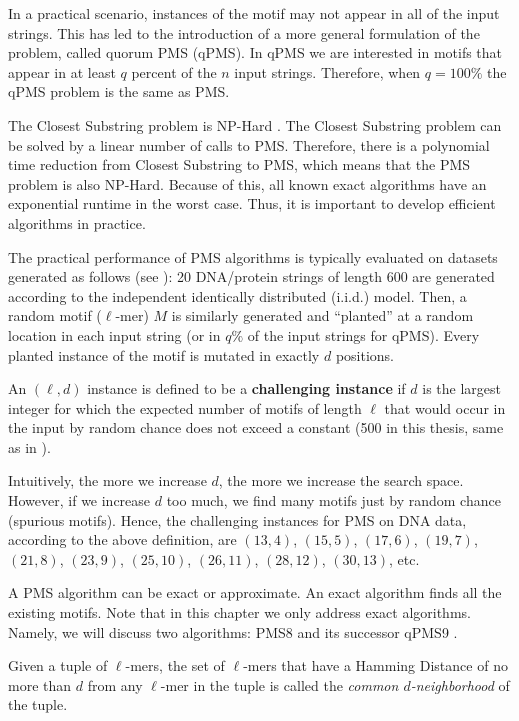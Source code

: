 In a practical scenario, instances of the motif may not appear in all of
the input strings. This has led to the introduction of a more general
formulation of the problem, called quorum PMS (qPMS). In qPMS we are interested
in motifs that appear in at least $q$ percent of the $n$ input strings.
Therefore, when $q=100\%$ the qPMS problem is the same as PMS.

The Closest Substring problem is NP-Hard \cite{LLM+99}. The Closest Substring
problem can be solved by a linear number of calls to PMS. Therefore,
there is a polynomial time reduction from Closest Substring to PMS, which
means that the PMS problem is also NP-Hard. Because of this, all known exact
algorithms have an exponential runtime in the worst case.
Thus, it is important to develop efficient algorithms in practice. 

The practical performance of PMS algorithms is
typically evaluated on datasets generated as follows (see \cite{Pev00,DBR07}):
20 DNA/protein strings of length 600 are generated according to the
independent identically distributed (i.i.d.) model. Then, a random
motif ($\ell$-mer) $M$ is similarly generated and ``planted'' at a random
location in each input string (or in $q\%$ of the input strings for qPMS).
Every planted instance of the motif is mutated in exactly $d$ positions.


\begin{definition}
An $(\ell,d)$ instance is defined to
be a {\bf challenging instance} if $d$ is the largest integer for which the
expected number of motifs of length $\ell$ that would occur in
the input by random chance does not exceed a constant (500 in this thesis, same
as in \cite{NRPMS14}).
\end{definition}

Intuitively, the more we increase $d$, the more we increase the search space.
However, if we increase $d$ too much, we find many motifs just by
random chance (spurious motifs). Hence, the challenging instances for PMS on
DNA data, according to the above definition, are $(13,4)$, $(15,5)$, $(17,6)$,
$(19,7)$, $(21,8)$, $(23,9)$, $(25,10)$, $(26,11)$, $(28,12)$, $(30,13)$, etc.

A PMS algorithm can be exact or approximate. An exact algorithm finds all
the existing motifs. Note that in this chapter we only address exact algorithms. 
Namely, we will discuss two algorithms: PMS8 \cite{NRPMS14}
and its successor qPMS9 \cite{NRPMS15}.

Given a tuple of $\ell$-mers, the set of $\ell$-mers that have a Hamming
Distance of no more than $d$ from any $\ell$-mer in the tuple is called the
{\em common $d$-neighborhood} of the tuple.

